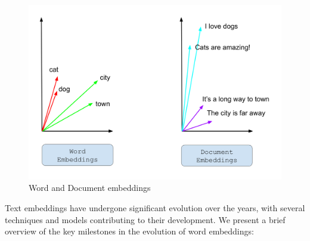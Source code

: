 \begin{figure}
    \centering
    \includegraphics[width=\textwidth]{Figures/02/02_embeddings.png}
    \caption{Word and Document embeddings}
    \label{fig:word_and_document_embeddings}
\end{figure}

Text embeddings have undergone significant evolution over the years, with several techniques and models contributing to their development. We present a brief overview of the key milestones in the evolution of word embeddings:

